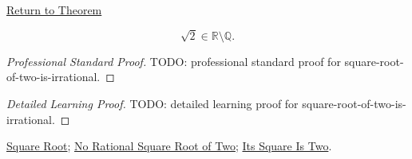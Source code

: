 \newpage
{}
\label{prf:square-root-of-two-is-irrational}

\begin{remark*}[Return]
\hyperref[thm:square-root-of-two-is-irrational]{Return to Theorem}
\end{remark*}

\begin{theorem*}
\[
\sqrt2\in\mathbb{R}\setminus\mathbb{Q}.
\]
\end{theorem*}

\begin{proof}[Professional Standard Proof]
\LRAProofBodyStart
TODO: professional standard proof for square-root-of-two-is-irrational.
\end{proof}

\begin{proof}[Detailed Learning Proof]
\LRAProofBodyStart
TODO: detailed learning proof for square-root-of-two-is-irrational.
\end{proof}

\begin{remark*}
\end{remark*}

\begin{dependencies}
\hyperref[def:square-root]{Square Root};
\hyperref[thm:no-rational-square-root-of-two]{No Rational Square Root of Two};
\hyperref[thm:sqrt-two-squared-is-two]{Its Square Is Two}.
\end{dependencies}

\clearpage
